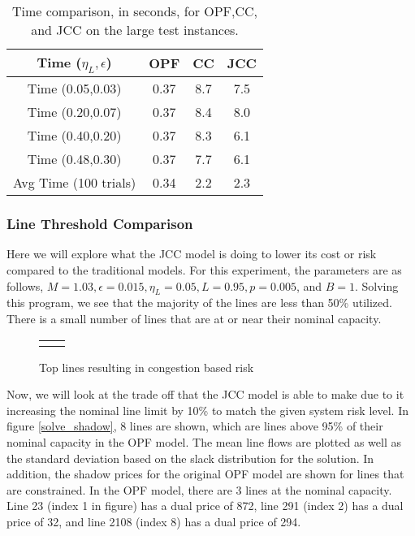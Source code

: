 \begin{table}
\centering
\begin{tabular}{| c| c c c| }
\hline
Time ($\eta_L,\epsilon$) & OPF & CC & JCC \\
\hline
\hline
Time (0.05,0.03)& 0.37  & 8.7 & 7.5 \\
Time (0.20,0.07)& 0.37  & 8.4 & 8.0 \\
Time (0.40,0.20)& 0.37  & 8.3 & 6.1 \\
Time (0.48,0.30)& 0.37  & 7.7 & 6.1 \\
\hline
\hline
Avg Time (100 trials)& 0.34  & 2.2 & 2.3 \\
\hline
\end{tabular}
\caption{Time comparison, in seconds, for OPF,CC, and JCC on the large test instances.}\label{solve_time}
\end{table}


\subsubsection*{Line Threshold Comparison}
Here we will explore what the JCC model is doing to lower its cost or risk compared to the traditional models.  For this experiment, the parameters are as follows, $M=1.03, \epsilon=0.015, \eta_L=0.05, L=0.95, p=0.005$, and $B=1$.  Solving this program, we see that the majority of the lines are less than 50\% utilized.  There is a small number of lines that are at or near their nominal capacity.

\begin{figure}
\begin{tabular}{c c}

&

\end{tabular}
\caption{Top lines resulting in congestion based risk}
\end{figure}


Now, we will look at the trade off that the JCC model is able to make due to it increasing the nominal line limit by 10\% to match the given system risk level.  In figure \ref{solve_shadow}, 8 lines are shown, which are lines above 95\% of their nominal capacity in the OPF model.  The mean line flows are plotted as well as the standard deviation based on the slack distribution for the solution.  
In addition, the shadow prices for the original OPF model are shown for lines that are constrained.  In the OPF model, there are 3 lines at the nominal capacity.  Line 23 (index 1 in figure) has a dual price of 872, line 291 (index 2) has a dual price of 32, and line 2108 (index 8) has a dual price of 294.


